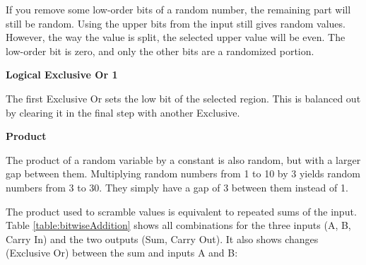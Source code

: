 \documentclass[preprint]{sigplanconf}
\begin{document}
If you remove some low-order bits of a random number, the remaining part will still be random. Using the upper bits from the input still gives random values. However, the way the value is split, the selected upper value will be even. The low-order bit is zero, and only the other bits are a randomized portion.

\textbf{Logical Exclusive Or 1}

The first Exclusive Or sets the low bit of the selected region. This is balanced out by clearing it in the final step with another Exclusive.

\textbf{Product}

The product of a random variable by a constant is also random, but with a larger gap between them. Multiplying random numbers from 1 to 10 by 3 yields random numbers from 3 to 30. They simply have a gap of 3 between them instead of 1.

The product used to scramble values is equivalent to repeated sums of the input. Table \ref{table:bitwiseAddition} shows all combinations for the three inputs (A, B, Carry In) and the two outputs (Sum, Carry Out). It also shows changes (Exclusive Or) between the sum and inputs A and B:
\end{document}
